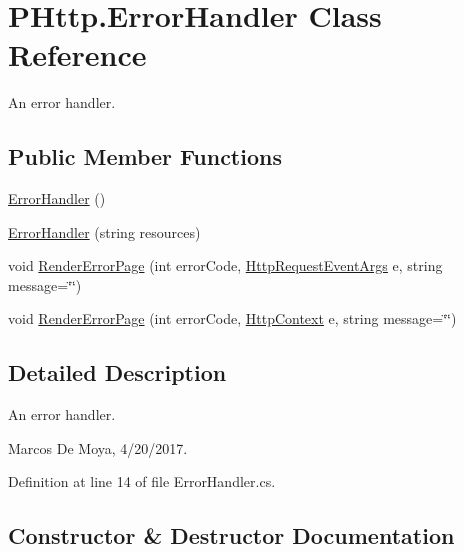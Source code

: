 \hypertarget{class_p_http_1_1_error_handler}{}\section{P\+Http.\+Error\+Handler Class Reference}
\label{class_p_http_1_1_error_handler}


An error handler.  


\subsection*{Public Member Functions}
\begin{DoxyCompactItemize}
\item 
\hyperlink{class_p_http_1_1_error_handler_a9f345c2059f191140835dafcb2f60482}{Error\+Handler} ()
\item 
\hyperlink{class_p_http_1_1_error_handler_ac59475bdf366717e5db2c235689d9d64}{Error\+Handler} (string resources)
\item 
void \hyperlink{class_p_http_1_1_error_handler_a3410f7bc3ca877d7e09c094839c09c2c}{Render\+Error\+Page} (int error\+Code, \hyperlink{class_p_http_1_1_http_request_event_args}{Http\+Request\+Event\+Args} e, string message=\char`\"{}\char`\"{})
\item 
void \hyperlink{class_p_http_1_1_error_handler_ab2c5ad53251abe6a4f23f782dcd27498}{Render\+Error\+Page} (int error\+Code, \hyperlink{class_p_http_1_1_http_context}{Http\+Context} e, string message=\char`\"{}\char`\"{})
\end{DoxyCompactItemize}


\subsection{Detailed Description}
An error handler. 

Marcos De Moya, 4/20/2017. 

Definition at line 14 of file Error\+Handler.\+cs.



\subsection{Constructor \& Destructor Documentation}
\mbox{\label{class_p_http_1_1_error_handler_a9f345c2059f191140835dafcb2f60482}} 
